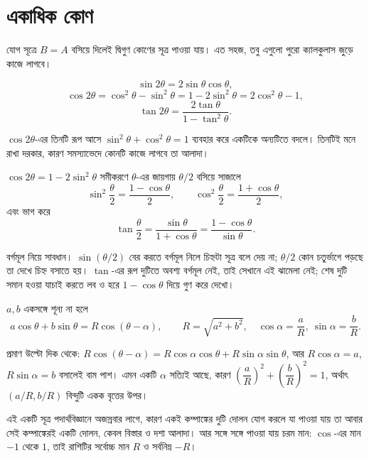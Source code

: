 \documentclass[11pt]{article}
\begin{document}
\section{একাধিক কোণ}

যোগ সূত্রে $B = A$ বসিয়ে দিলেই দ্বিগুণ কোণের সূত্র পাওয়া যায়। এত সহজ, তবু
এগুলো পুরো ক্যালকুলাস জুড়ে কাজে লাগবে।

\begin{idea}[দ্বিগুণ কোণ]
\[
  \sin 2\theta = 2\sin\theta\cos\theta ,
\]
\[
  \cos 2\theta = \cos^{2}\theta - \sin^{2}\theta
               = 1 - 2\sin^{2}\theta
               = 2\cos^{2}\theta - 1 ,
\]
\[
  \tan 2\theta = \frac{2\tan\theta}{1-\tan^{2}\theta} .
\]
\end{idea}

$\cos 2\theta$-এর তিনটি রূপ আসে $\sin^{2}\theta + \cos^{2}\theta = 1$ ব্যবহার
করে একটিকে অন্যটিতে বদলে। তিনটিই মনে রাখা দরকার, কারণ সমস্যাভেদে কোনটি কাজে
লাগবে তা আলাদা।

\begin{idea}[অর্ধ কোণ]
$\cos 2\theta = 1 - 2\sin^{2}\theta$ সমীকরণে $\theta$-এর জায়গায়
$\theta/2$ বসিয়ে সাজালে
\[
  \sin^{2}\frac{\theta}{2} = \frac{1-\cos\theta}{2}, \qquad
  \cos^{2}\frac{\theta}{2} = \frac{1+\cos\theta}{2} ,
\]
এবং ভাগ করে
\[
  \tan\frac{\theta}{2} = \frac{\sin\theta}{1+\cos\theta}
                       = \frac{1-\cos\theta}{\sin\theta} .
\]
\end{idea}

বর্গমূল নিয়ে সাবধান। $\sin(\theta/2)$ বের করতে বর্গমূল নিলে চিহ্নটা সূত্র
বলে দেয় না; $\theta/2$ কোন চতুর্ভাগে পড়ছে তা দেখে চিহ্ন বসাতে হয়। $\tan$-এর
রূপ দুটিতে অবশ্য বর্গমূল নেই, তাই সেখানে এই ঝামেলা নেই; শেষ দুটি সমান হওয়া
যাচাই করতে লব ও হরে $1-\cos\theta$ দিয়ে গুণ করে দেখো।

\begin{idea}
$a, b$ একসঙ্গে শূন্য না হলে
\[
  a\cos\theta + b\sin\theta = R\cos(\theta - \alpha),
  \qquad R = \sqrt{a^{2}+b^{2}}, \quad
  \cos\alpha = \frac{a}{R}, \ \sin\alpha = \frac{b}{R} .
\]
\end{idea}

প্রমাণ উল্টো দিক থেকে: $R\cos(\theta-\alpha) = R\cos\alpha\cos\theta
+ R\sin\alpha\sin\theta$, আর $R\cos\alpha = a$, $R\sin\alpha = b$ বসালেই বাম
পাশ। এমন একটি $\alpha$ সত্যিই আছে, কারণ
$\left( \dfrac{a}{R} \right)^{2} + \left( \dfrac{b}{R} \right)^{2} = 1$,
অর্থাৎ $(a/R, b/R)$ বিন্দুটি একক বৃত্তের উপর।

এই একটি সূত্র পদার্থবিজ্ঞানে অজস্রবার লাগে, কারণ একই কম্পাঙ্কের দুটি দোলন যোগ
করলে যা পাওয়া যায় তা আবার সেই কম্পাঙ্কেরই একটি দোলন, কেবল বিস্তার ও দশা
আলাদা। আর সঙ্গে সঙ্গে পাওয়া যায় চরম মান: $\cos$-এর মান $-1$ থেকে $1$, তাই
রাশিটির সর্বোচ্চ মান $R$ ও সর্বনিম্ন $-R$।
\end{document}
